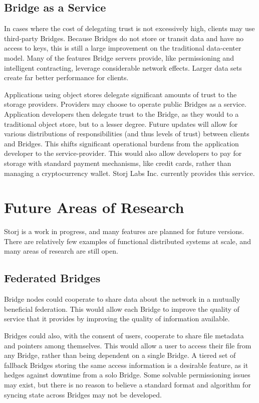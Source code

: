 \documentclass[a4paper,10pt]{article}
\begin{document}
\subsection{Bridge as a Service}
In cases where the cost of delegating trust is not excessively high, clients may use third-party Bridges. Because Bridges do not store or transit data and have no access to keys, this is still a large improvement on the traditional data-center model. Many of the features Bridge servers provide, like permissioning and intelligent contracting, leverage considerable network effects. Larger data sets create far better performance for clients.

Applications using object stores delegate significant amounts of trust to the storage providers. Providers may choose to operate public Bridges as a service. Application developers then delegate trust to the Bridge, as they would to a traditional object store, but to a lesser degree. Future updates will allow for various distributions of responsibilities (and thus levels of trust) between clients and Bridges. This shifts significant operational burdens from the application developer to the service-provider. This would also allow developers to pay for storage with standard payment mechanisms, like credit cards, rather than managing a cryptocurrency wallet. Storj Labs Inc. currently provides this service.


\section{Future Areas of Research}
Storj is a work in progress, and many features are planned for future versions. There are relatively few examples of functional distributed systems at scale, and many areas of research are still open.

\subsection{Federated Bridges}
Bridge nodes could cooperate to share data about the network in a mutually beneficial federation. This would allow each Bridge to improve the quality of service that it provides by improving the quality of information available.

Bridges could also, with the consent of users, cooperate to share file metadata and pointers among themselves. This would allow a user to access their file from any Bridge, rather than being dependent on a single Bridge. A tiered set of fallback Bridges storing the same access information is a desirable feature, as it hedges against downtime from a solo Bridge. Some solvable permissioning issues may exist, but there is no reason to believe a standard format and algorithm for syncing state across Bridges may not be developed.
\end{document}
